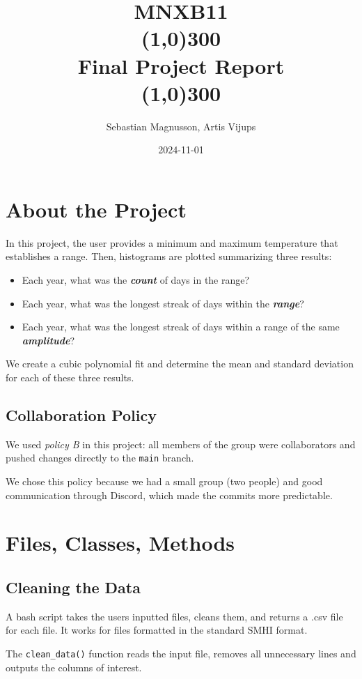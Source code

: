 \documentclass[12pt]{article}
\title{ 
    MNXB11 \\
    \line(1,0){300}\\
    \huge{Final Project Report}\\
    \line(1,0){300}}
\author{Sebastian Magnusson, Artis Vijups}
\date{\small{2024-11-01}}
\begin{document}
\maketitle
\newpage
\section{About the Project}

In this project, the user provides a minimum and maximum temperature that establishes a range. Then, histograms are plotted summarizing three results:
\begin{itemize}
\item Each year, what was the {\textit{\textbf{count}}} of days in the range?
\item Each year, what was the longest streak of days within the {\textit{\textbf{range}}}?
\item Each year, what was the longest streak of days within a range of the same {\textit{\textbf{amplitude}}}?
\end{itemize}

We create a cubic polynomial fit and determine the mean and standard deviation for each of these three results.

\subsection{Collaboration Policy}

We used {\textit{policy B}} in this project: all members of the group were collaborators and pushed changes directly to the {\tt main} branch.

We chose this policy because we had a small group (two people) and good communication through Discord, which made the commits more predictable.

\section{Files, Classes, Methods}

\subsection{Cleaning the Data}

A bash script takes the users inputted files, cleans them, and returns a .csv file for each file. It works for files formatted in the standard SMHI format.

The {\tt clean\_data()} function reads the input file, removes all unnecessary lines and outputs the columns of interest.   
\end{document}
